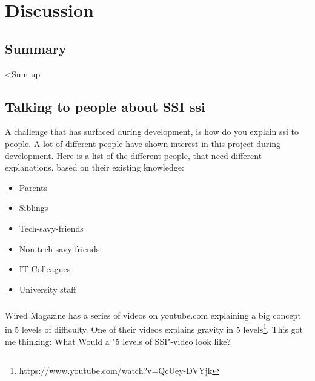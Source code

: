 \chapter{Discussion}

\section{Summary}

<Sum up 

\section{Talking to people about SSI \acrfull{ssi}}

A challenge that has surfaced during development, is how do you explain \acrshort{ssi} to people. A lot of different people have shown interest in this project during development. Here is a list of the different people, that need different explanations, based on their existing knowledge:

\begin{itemize}
    \item Parents
    \item Siblings
    \item Tech-savy-friends
    \item Non-tech-savy friends
    \item IT Colleagues
    \item University staff
\end{itemize}

\paragraph{}
Wired Magazine has a series of videos on youtube.com explaining a big concept in 5 levels of difficulty. One of their videos explains gravity in 5 levels\footnote{https://www.youtube.com/watch?v=QcUey-DVYjk}. This got me thinking: What Would a "5 levels of SSI"-video look like?

